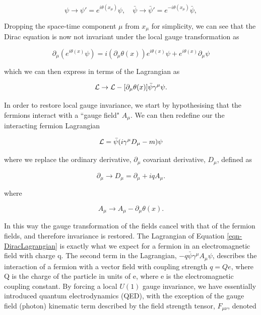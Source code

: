 \begin{equation}
\psi \to \psi'= e^{i \theta(x_{\mu})}\psi, \quad \bar{\psi} \to \bar{\psi}' = e^{- i \theta(x_{\mu})}\bar{\psi},
\end{equation} 

Dropping the space-time component $\mu$ from $x_{\mu}$ for simplicity, we can see that the Dirac equation is now not invariant under the local gauge transformation as

\begin{equation}
\partial_{\mu} (e^{i\theta(x)}\psi) = i(\partial_{\mu}\theta(x))e^{i\theta(x)}\psi + e^{i\theta(x)} \partial_{\mu}\psi 
\end{equation}

which we can then express in terms of the Lagrangian as

\begin{equation}
\mathcal{L} \to \mathcal{L} - [\partial_{\mu} \theta(x)] \bar{\psi} \gamma^{\mu} \psi.
\end{equation}

In order to restore local gauge invariance, we start by hypothesising that the fermions interact with a ``gauge field" $A_{\mu}$. We can then redefine our the interacting fermion Lagrangian 

\begin{equation} \label{eqn-DiracLagrangian}
\mathcal{L} = \bar{\psi}(i \gamma^{\mu}D_{\mu}-m)\psi
\end{equation}

where we replace the ordinary derivative, $\partial_{\mu}$ covariant derivative, $D_{\mu}$, defined as

\begin{equation}
\partial_{\mu} \to D_{\mu} = \partial_{\mu} + iqA_{\mu}.
\end{equation}

where

\begin{equation}
A_{\mu} \to A_{\mu} - \partial_{\mu} \theta (x).
\end{equation}

In this way the gauge transformation of the fields cancel with that of the fermion fields, and therefore invariance is restored. The Lagrangian of Equation \ref{eqn-DiracLagrangian} is exactly what we expect for a fermion in an electromagnetic field with charge q. The second term in the Lagrangian, $-q\bar{\psi}\gamma^{\mu}A_{\mu}\psi$, describes the interaction of a fermion with a vector field with coupling strength $q=Qe$, where Q is the charge of the particle in units of e, where e is the electromagnetic coupling constant. By forcing a local $U(1)$ gauge invariance, we have essentially introduced quantum electrodynamics (QED), with the exception of the gauge field (photon) kinematic term described by the field strength tensor, $F_{\mu \nu}$, denoted  

